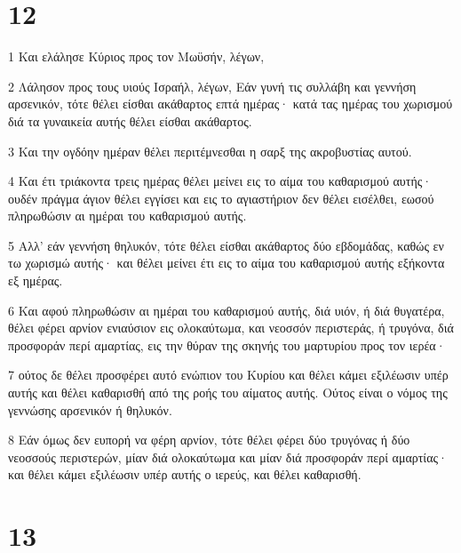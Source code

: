 \chapter{12}

\par 1 Και ελάλησε Κύριος προς τον Μωϋσήν, λέγων,
\par 2 Λάλησον προς τους υιούς Ισραήλ, λέγων, Εάν γυνή τις συλλάβη και γεννήση αρσενικόν, τότε θέλει είσθαι ακάθαρτος επτά ημέρας· κατά τας ημέρας του χωρισμού διά τα γυναικεία αυτής θέλει είσθαι ακάθαρτος.
\par 3 Και την ογδόην ημέραν θέλει περιτέμνεσθαι η σαρξ της ακροβυστίας αυτού.
\par 4 Και έτι τριάκοντα τρεις ημέρας θέλει μείνει εις το αίμα του καθαρισμού αυτής· ουδέν πράγμα άγιον θέλει εγγίσει και εις το αγιαστήριον δεν θέλει εισέλθει, εωσού πληρωθώσιν αι ημέραι του καθαρισμού αυτής.
\par 5 Αλλ' εάν γεννήση θηλυκόν, τότε θέλει είσθαι ακάθαρτος δύο εβδομάδας, καθώς εν τω χωρισμώ αυτής· και θέλει μείνει έτι εις το αίμα του καθαρισμού αυτής εξήκοντα εξ ημέρας.
\par 6 Και αφού πληρωθώσιν αι ημέραι του καθαρισμού αυτής, διά υιόν, ή διά θυγατέρα, θέλει φέρει αρνίον ενιαύσιον εις ολοκαύτωμα, και νεοσσόν περιστεράς, ή τρυγόνα, διά προσφοράν περί αμαρτίας, εις την θύραν της σκηνής του μαρτυρίου προς τον ιερέα·
\par 7 ούτος δε θέλει προσφέρει αυτό ενώπιον του Κυρίου και θέλει κάμει εξιλέωσιν υπέρ αυτής και θέλει καθαρισθή από της ροής του αίματος αυτής. Ούτος είναι ο νόμος της γεννώσης αρσενικόν ή θηλυκόν.
\par 8 Εάν όμως δεν ευπορή να φέρη αρνίον, τότε θέλει φέρει δύο τρυγόνας ή δύο νεοσσούς περιστερών, μίαν διά ολοκαύτωμα και μίαν διά προσφοράν περί αμαρτίας· και θέλει κάμει εξιλέωσιν υπέρ αυτής ο ιερεύς, και θέλει καθαρισθή.

\chapter{13}

